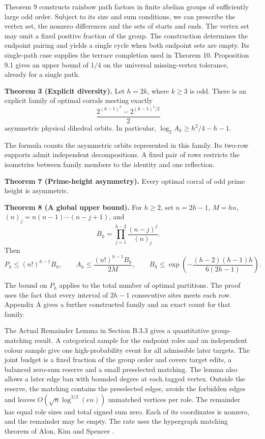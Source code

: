\documentclass[11pt,a4paper]{article}
\newcommand{\statementstart}{\par\addvspace{6pt plus 1pt minus 1pt}\noindent}
\begin{document}
Theorem 9 constructs rainbow path factors in finite abelian groups of sufficiently large odd order. Subject to its size and sum conditions, we can prescribe the vertex set, the nonzero differences and the sets of starts and ends. The vertex set may omit a fixed positive fraction of the group. The construction determines the endpoint pairing and yields a single cycle when both endpoint sets are empty. Its single-path case supplies the terrace completion used in Theorem 10. Proposition 9.1 gives an upper bound of \(1/4\) on the universal missing-vertex tolerance, already for a single path.

\statementstart\textbf{Theorem 3 (Explicit diversity).} Let \(h=2k\), where \(k\geq3\) is odd. There is an explicit family of optimal corrals meeting exactly \[
 \frac{2^{(k-1)^2}-2^{(k-1)^2/2}}{2}
\] asymmetric physical dihedral orbits. In particular, \(\log_2 A_h\geq h^2/4-h-1\).

The formula counts the asymmetric orbits represented in this family. Its two-row supports admit independent decompositions. A fixed pair of rows restricts the isometries between family members to the identity and one reflection.

\statementstart\textbf{Theorem 7 (Prime-height asymmetry).} Every optimal corral of odd prime height is asymmetric.

\statementstart\textbf{Theorem 8 (A global upper bound).} For \(h\geq2\), set \(n=2h-1\), \(M=hn\), \((n)_j=n(n-1)\cdots(n-j+1)\), and \[
 B_h=\prod_{j=1}^{h-2}\frac{(n-j)^j}{(n)_j}.
\] Then \[
 P_h\leq(n!)^{h-1}B_h,\qquad
 A_h\leq\frac{(n!)^{h-1}B_h}{2M},\qquad
 B_h\leq\exp\!\left(-\frac{(h-2)(h-1)h}{6(2h-1)}\right).
\]

The bound on \(P_h\) applies to the total number of optimal partitions. The proof uses the fact that every interval of \(2h-1\) consecutive sites meets each row. Appendix A gives a further constructed family and an exact count for that family.

The Actual Remainder Lemma in Section B.3.3 gives a quantitative group-matching result. A categorical sample for the endpoint roles and an independent colour sample give one high-probability event for all admissible later targets. The joint budget is a fixed fraction of the group order and covers target edits, a balanced zero-sum reserve and a small preselected matching. The lemma also allows a later edge ban with bounded degree at each tagged vertex. Outside the reserve, the matching contains the preselected edges, avoids the forbidden edges and leaves \(O(\sqrt n\log^{3/2}(en))\) unmatched vertices per role. The remainder has equal role sizes and total signed sum zero. Each of its coordinates is nonzero, and the remainder may be empty. The rate uses the hypergraph matching theorem of Alon, Kim and Spencer \cite{AKS97}.
\end{document}
